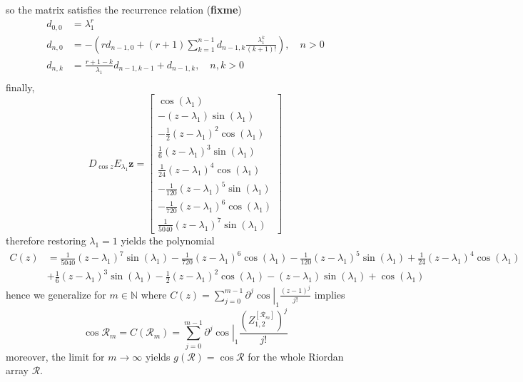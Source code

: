 so the matrix satisfies the recurrence relation (\textbf{fixme})
\begin{displaymath}
\begin{split}
d_{0,0}&=\lambda_{1}^{r}\\
d_{n,0}&=-\left(r d_{n-1, 0} + (r+1)\sum_{k=1}^{n-1}{d_{n-1, k}\frac{\lambda_{1}^{k}}{(k+1)!}}\right), \quad n>0 \\
d_{n,k}&=\frac{r+1-k}{\lambda_{1}}d_{n-1, k-1} + d_{n-1,k}, \quad n,k > 0\\
\end{split}
\end{displaymath}
finally,
\begin{displaymath}
D_{\cos{z}}E_{\lambda_{1}}\boldsymbol{z} = \left[\begin{matrix}\cos{\left (\lambda_{1} \right )}\\- \left(z - \lambda_{1}\right) \sin{\left (\lambda_{1} \right )}\\- \frac{1}{2} \left(z - \lambda_{1}\right)^{2} \cos{\left (\lambda_{1} \right )}\\\frac{1}{6} \left(z - \lambda_{1}\right)^{3} \sin{\left (\lambda_{1} \right )}\\\frac{1}{24} \left(z - \lambda_{1}\right)^{4} \cos{\left (\lambda_{1} \right )}\\- \frac{1}{120} \left(z - \lambda_{1}\right)^{5} \sin{\left (\lambda_{1} \right )}\\- \frac{1}{720} \left(z - \lambda_{1}\right)^{6} \cos{\left (\lambda_{1} \right )}\\\frac{1}{5040} \left(z - \lambda_{1}\right)^{7} \sin{\left (\lambda_{1} \right )}\end{matrix}\right]
\end{displaymath}
therefore restoring $\lambda_{1}=1$ yields the polynomial
\begin{displaymath}
\begin{split}
C{\left (z \right )} &= \frac{1}{5040} \left(z - \lambda_{1}\right)^{7} \sin{\left (\lambda_{1} \right )} - \frac{1}{720} \left(z - \lambda_{1}\right)^{6} \cos{\left (\lambda_{1} \right )} - \frac{1}{120} \left(z - \lambda_{1}\right)^{5} \sin{\left (\lambda_{1} \right )} + \frac{1}{24} \left(z - \lambda_{1}\right)^{4} \cos{\left (\lambda_{1} \right )} \\
                     &+ \frac{1}{6} \left(z - \lambda_{1}\right)^{3} \sin{\left (\lambda_{1} \right )} - \frac{1}{2} \left(z - \lambda_{1}\right)^{2} \cos{\left (\lambda_{1} \right )} - \left(z - \lambda_{1}\right) \sin{\left (\lambda_{1} \right )} + \cos{\left (\lambda_{1} \right )}
\end{split}
\end{displaymath}
hence we generalize for $m\in\mathbb{N}$ where $C(z) = \sum_{j=0}^{m-1}{\left.{\partial^{j} \cos}\right|_{1} \frac{(z-1)^{j}}{j!}}$ implies
\begin{displaymath}
\cos{\mathcal{R}_{m}} = C{\left (\mathcal{R}_{m} \right )} = \sum_{j=0}^{m-1}{\left.{\partial^{j} \cos}\right|_{1} \frac{{\left(Z_{1,2}^{\left[\mathcal{R}_{m}\right]}\right)}^{j}}{j!}}
\end{displaymath}
moreover, the limit for $m \rightarrow \infty$ yields $ g{\left (\mathcal{R}
\right )} = \cos{\mathcal{R}} $ for the whole Riordan array $\mathcal{R}$.
\fi
